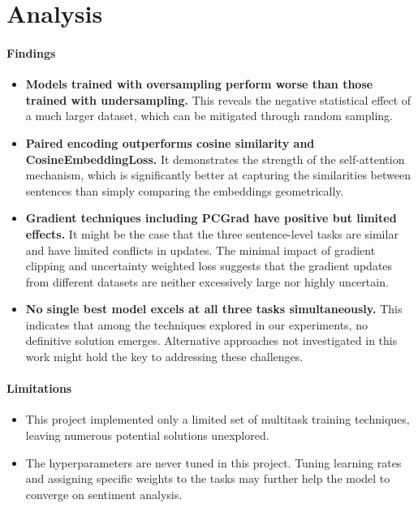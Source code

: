 \documentclass{article}
\begin{document}
\section{Analysis}
  \paragraph{Findings}
    \begin{itemize}
      \item \textbf{Models trained with oversampling perform worse than those trained with undersampling.}
      This reveals the negative statistical effect of a much larger dataset, which can be mitigated through random sampling.
      \item \textbf{Paired encoding outperforms cosine similarity and CosineEmbeddingLoss.}
      It demonstrates the strength of the self-attention mechanism, which is significantly better at capturing the similarities between sentences than simply comparing the embeddings geometrically.
      \item \textbf{Gradient techniques including PCGrad have positive but limited effects.}
      It might be the case that the three sentence-level tasks are similar and have limited conflicts in updates.
      The minimal impact of gradient clipping and uncertainty weighted loss suggests that the gradient updates from different datasets are neither excessively large nor highly uncertain.
      \item \textbf{No single best model excels at all three tasks simultaneously.}
      This indicates that among the techniques explored in our experiments, no definitive solution emerges.
      Alternative approaches not investigated in this work might hold the key to addressing these challenges.
    \end{itemize}

  \paragraph{Limitations}
    \begin{itemize}
    \item This project implemented only a limited set of multitask training techniques,
    leaving numerous potential solutions unexplored.
    \item The hyperparameters are never tuned in this project.
    Tuning learning rates and assigning specific weights to the tasks may further help the model to converge on sentiment analysis.
    \end{itemize}



\end{document}
